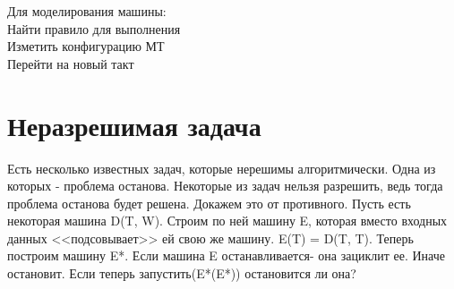 \documentclass[a4paper,12pt]{article}
\begin{document}
Для моделирования машины:\\
Найти правило для выполнения\\
Изметить конфигурацию МТ\\
Перейти на новый такт\\

\section{Неразрешимая задача}
Есть несколько известных задач, которые нерешимы алгоритмически. Одна из которых - проблема останова. Некоторые из задач нельзя разрешить, ведь тогда проблема останова будет решена. 
Докажем это от противного. Пусть есть некоторая машина D(T, W). Строим по ней машину E, которая вместо входных данных <<подсовывает>> ей свою же машину. E(T) = D(T, T). Теперь построим машину E*. Если машина E останавливается-  она зациклит ее. Иначе остановит. Если теперь запустить(E*(E*)) остановится ли она?
\end{document}
